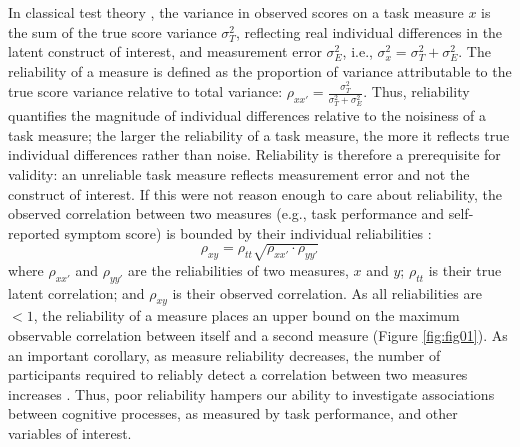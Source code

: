 \documentclass[a4paper,12pt]{article}
\begin{document}
In classical test theory \cite{allen2001introduction}, the variance in observed scores on a task measure $x$ is the sum of the true score variance $\sigma^2_T$, reflecting real individual differences in the latent construct of interest, and measurement error $\sigma^2_E$, i.e., $\sigma^2_x = \sigma^2_T + \sigma^2_E$. The reliability of a measure is defined as the proportion of variance attributable to the true score variance relative to total variance: $\rho_{xx'} = \frac{\sigma^2_T}{\sigma^2_T + \sigma^2_E}$. Thus, reliability quantifies the magnitude of individual differences relative to the noisiness of a task measure; the larger the reliability of a task measure, the more it reflects true individual differences rather than noise. Reliability is therefore a prerequisite for validity: an unreliable task measure reflects measurement error and not the construct of interest. If this were not reason enough to care about reliability, the observed correlation between two measures (e.g., task performance and self-reported symptom score) is bounded by their individual reliabilities \cite{Spearman1904-mo}: 
\begin{equation}
    \rho_{xy} = \rho_{tt} \sqrt{\rho_{xx'} \cdot \rho_{yy'}}
\end{equation}
where $\rho_{xx'}$ and $\rho_{yy'}$ are the reliabilities of two measures, $x$ and $y$; $\rho_{tt}$ is their true latent correlation; and  $\rho_{xy}$ is their observed correlation. As all reliabilities are $<1$, the reliability of a measure places an upper bound on the maximum observable correlation between itself and a second measure (Figure \ref{fig:fig01}). As an important corollary, as measure reliability decreases, the number of participants required to reliably detect a correlation between two measures increases \cite{Parsons2019-jw}. Thus, poor reliability hampers our ability to investigate associations between cognitive processes, as measured by task performance, and other variables of interest. 
\end{document}
